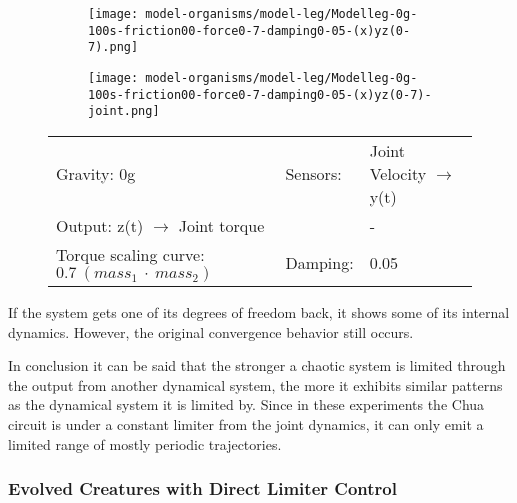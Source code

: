\documentclass[main]{subfiles}
\begin{document}
\begin{figure}[H]
	\centering
		\begin{subfigure}[c]{0.45\textwidth}
	\texttt{[image: model-organisms/model-leg/Modelleg-0g-100s-friction00-force0-7-damping0-05-(x)yz(0-7).png]}
		\end{subfigure}
	\begin{subfigure}[c]{0.45\textwidth}
	\texttt{[image: model-organisms/model-leg/Modelleg-0g-100s-friction00-force0-7-damping0-05-(x)yz(0-7)-joint.png]}
		\end{subfigure}
	\caption[Limited chaotic controller controlling model leg]{}
	\begin{tabular}{l|ll}
	\hline 
	Gravity: 0g  & Sensors: & Joint Velocity \(\rightarrow\) y(t)\\
	 Output: z(t) \(\rightarrow\) Joint torque & & - \\
	  Torque scaling curve: \(0.7~(mass_1~\cdot~mass_2)\) & Damping: & 0.05 \\
	  \hline
	\end{tabular}

	\label{figure:limited-damped-model-leg8}
\end{figure}

If the system gets one of its degrees of freedom back, it shows some of its internal dynamics. However, the original convergence behavior still occurs.

In conclusion it can be said that the stronger a chaotic system is limited through the output from another dynamical system, the more it exhibits similar patterns as the dynamical system it is limited by. Since in these experiments the Chua circuit is under a constant limiter from the joint dynamics, it can only emit a limited range of mostly periodic trajectories.

\subsubsection{Evolved Creatures with Direct Limiter Control}
\label{subsec:Evolved-lim-creatures}
\end{document}
